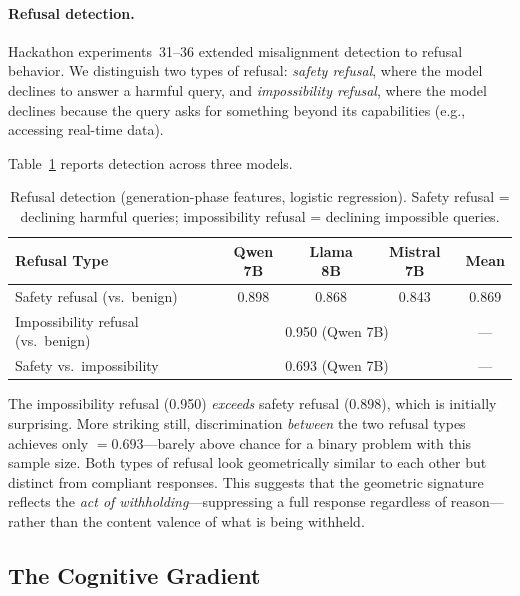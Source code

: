 \paragraph{Refusal detection.}
Hackathon experiments~31--36 extended misalignment detection to refusal behavior.
We distinguish two types of refusal: \emph{safety refusal}, where the model declines to answer a harmful query, and \emph{impossibility refusal}, where the model declines because the query asks for something beyond its capabilities (e.g., accessing real-time data).

Table~\ref{tab:refusal_auroc} reports detection \auroc across three models.

\begin{table}[t]
  \centering
  \caption{Refusal detection \auroc (generation-phase features, logistic regression).
  Safety refusal = declining harmful queries; impossibility refusal = declining impossible queries.}
  \label{tab:refusal_auroc}
  \begin{tabular}{@{}lcccc@{}}
    \toprule
    Refusal Type & Qwen 7B & Llama 8B & Mistral 7B & Mean \\
    \midrule
    Safety refusal (vs.\ benign)        & 0.898 & 0.868 & 0.843 & 0.869 \\
    Impossibility refusal (vs.\ benign) & \multicolumn{3}{c}{0.950 (Qwen 7B)} & --- \\
    Safety vs.\ impossibility           & \multicolumn{3}{c}{0.693 (Qwen 7B)} & --- \\
    \bottomrule
  \end{tabular}
\end{table}

The impossibility refusal \auroc (0.950) \emph{exceeds} safety refusal (0.898), which is initially surprising.
More striking still, discrimination \emph{between} the two refusal types achieves only \auroc $= 0.693$---barely above chance for a binary problem with this sample size.
Both types of refusal look geometrically similar to each other but distinct from compliant responses.
This suggests that the geometric signature reflects the \emph{act of withholding}---suppressing a full response regardless of reason---rather than the content valence of what is being withheld.

\subsection{The Cognitive Gradient}
\label{sec:cognitive_gradient}

